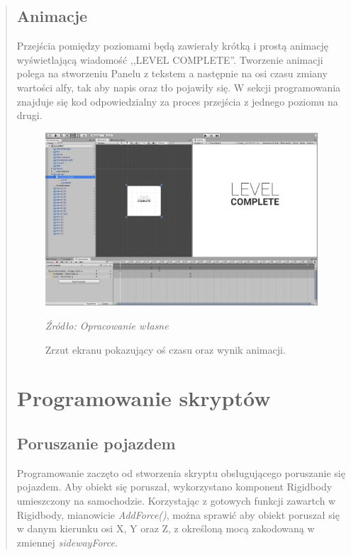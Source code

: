 \begin{quotation}
\subsection{Animacje}
\indent Przejścia pomiędzy poziomami będą zawierały krótką i prostą animację wyświetlającą wiadomość ,,LEVEL COMPLETE''. Tworzenie animacji polega na stworzeniu Panelu z tekstem a następnie na osi czasu zmiany wartości alfy, tak aby napis oraz tło pojawiły się. W sekcji programowania znajduje się kod odpowiedzialny za proces przejścia z jednego poziomu na drugi.


\begin{figure}[!hbt]
\centering
  \includegraphics[width=1\linewidth]{levelcomplete2.png}
  \caption{Zrzut ekranu pokazujący oś czasu oraz wynik animacji.}\label{rys_20}
  \begin{minipage}[t]{0.75\linewidth}
    \emph{Źródło: Opracowanie własne}
  \end{minipage}
\end{figure}


\newpage
\section{Programowanie skryptów}
\subsection{Poruszanie pojazdem}
\indent Programowanie zaczęto od stworzenia skryptu obsługującego poruszanie się pojazdem. Aby obiekt się poruszał, wykorzystano komponent Rigidbody umieszczony na samochodzie. Korzystając z gotowych funkcji zawartch w Rigidbody, mianowicie \textit{AddForce()}, można sprawić aby obiekt poruszał się w danym kierunku osi X, Y oraz Z, z określoną mocą zakodowaną w zmiennej \textit{sidewayForce}.


\end{quotation}
